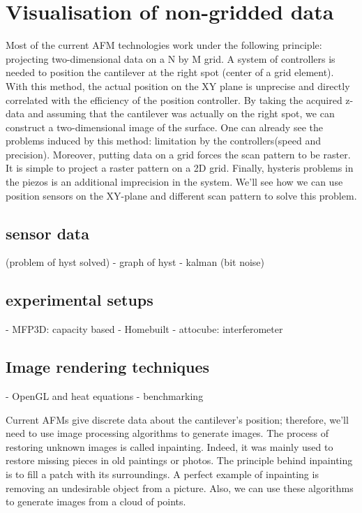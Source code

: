 \chapter{Visualisation of non-gridded data}

Most of the current AFM technologies work under the following principle: projecting two-dimensional data on a N by M grid. A system of controllers is needed to position the cantilever at the right spot (center of a grid element). With this method, the actual position on the XY plane is unprecise and directly correlated with the efficiency of the position controller. By taking the acquired z-data and assuming that the cantilever was actually on the right spot, we can construct a two-dimensional image of the surface. One can already see the problems induced by this method: limitation by the controllers(speed and precision). Moreover, putting data on a grid forces the scan pattern to be raster. It is simple to project a raster pattern on a 2D grid. Finally, hysteris problems in the piezos is an additional imprecision in the system. We'll see how we can use position sensors on the XY-plane and different scan pattern to solve this problem.

\section{sensor data}

(problem of hyst solved)
	- graph of hyst
	- kalman (bit noise)

\section{experimental setups}
	- MFP3D: capacity based
	- Homebuilt
		- attocube: interferometer

\section{Image rendering techniques}
- OpenGL and heat equations
	- benchmarking


Current AFMs give discrete data about the cantilever's position; therefore, we'll need to use image processing algorithms to generate images. The process of restoring unknown images is called inpainting. Indeed, it was mainly used to restore missing pieces in old paintings or photos. The principle behind inpainting is to fill a patch with its surroundings. A perfect example of inpainting is removing an undesirable object from a picture. Also, we can use these algorithms to generate images from a cloud of points.


